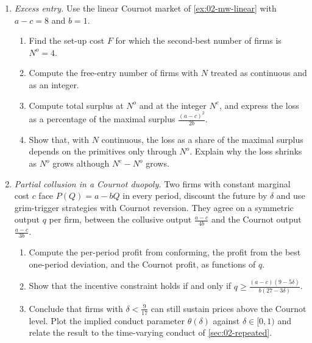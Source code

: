\begin{enumerate}[label=\arabic*., leftmargin=*, itemsep=6pt]
\item \textit{Excess entry.} Use the linear Cournot market of \cref{ex:02-mw-linear} with $a - c = 8$ and $b = 1$.
\begin{enumerate}[label=(\alph*)]
  \item Find the set-up cost $F$ for which the second-best number of firms is $N^o = 4$.
  \item Compute the free-entry number of firms with $N$ treated as continuous and as an integer.
  \item Compute total surplus at $N^o$ and at the integer $N^e$, and express the loss as a percentage of the maximal
  surplus $\frac{(a - c)^2}{2b}$.
  \item Show that, with $N$ continuous, the loss as a share of the maximal surplus depends on the primitives only
  through $N^o$. Explain why the loss shrinks as $N^o$ grows although $N^e - N^o$ grows.
\end{enumerate}

\item \textit{Partial collusion in a Cournot duopoly.} Two firms with constant marginal cost $c$ face
$P(Q) = a - bQ$ in every period, discount the future by $\delta$ and use grim-trigger strategies with Cournot
reversion. They agree on a symmetric
output $q$ per firm, between the collusive output $\frac{a - c}{4b}$ and the Cournot output $\frac{a - c}{3b}$.
\begin{enumerate}[label=(\alph*)]
  \item Compute the per-period profit from conforming, the profit from the best one-period deviation, and the Cournot
  profit, as functions of $q$.
  \item Show that the incentive constraint holds if and only if
  $q \ge \frac{(a - c)(9 - 5\delta)}{b(27 - 3\delta)}$.
  \item Conclude that firms with $\delta < \frac{9}{17}$ can still sustain prices above the Cournot level. Plot the
  implied conduct parameter $\theta(\delta)$ against $\delta \in [0, 1)$ and relate the result to the time-varying
  conduct of \cref{sec:02-repeated}.
\end{enumerate}


\end{enumerate}
